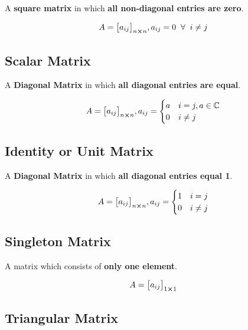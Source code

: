 \documentclass{article}
\begin{document}
A \textbf{square matrix} in which \textbf{all non-diagonal entries are zero}.

$$A={\begin{bmatrix}
        a_{ij}
    \end{bmatrix}}_{n \cross n}, a_{ij}=0 \hspace{2mm} \forall \hspace{2mm} i \not= j$$

\subsection{Scalar Matrix}

A \textbf{Diagonal Matrix} in which \textbf{all diagonal entries are equal}.

$$A={\begin{bmatrix}
        a_{ij}
    \end{bmatrix}}_{n \cross n}, a_{ij} = \begin{cases}
        a & i=j, a \in \mathbb{C} \\
        0 & i \not= j
    \end{cases} $$

\subsection{Identity or Unit Matrix}

A \textbf{Diagonal Matrix} in which \textbf{all diagonal entries equal 1}.

$$A={\begin{bmatrix}
        a_{ij}
    \end{bmatrix}}_{n \cross n}, a_{ij}=\begin{cases}
        1 & i=j       \\
        0 & i \not= j
    \end{cases} $$

\subsection{Singleton Matrix}

A matrix which consists of \textbf{only one element}.

$$A={\begin{bmatrix}
        a_{ij}
    \end{bmatrix}}_{1 \cross 1} $$

\subsection{Triangular Matrix}
\end{document}
